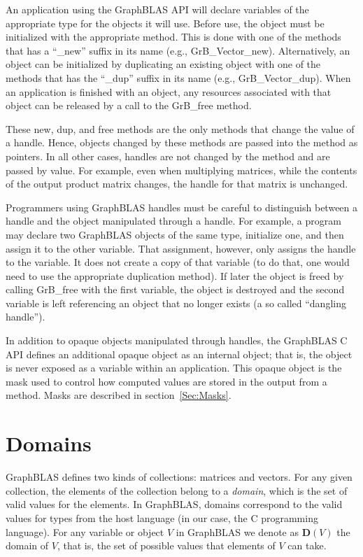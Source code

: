 An application using the GraphBLAS API will declare variables of the appropriate
type for the objects it will use.  Before use, the object must be initialized with 
the appropriate method.  This is done with one of the methods that has a ``{\sf \_new}'' suffix in its 
name (e.g., {\sf GrB\_Vector\_new}).  Alternatively, an object can be initialized by duplicating
an existing object with one of the methods that has the ``{\sf \_dup}'' suffix in its 
name  (e.g., {\sf GrB\_Vector\_dup}).   When an application is finished with 
an object, any resources associated with that object can be released by a
call to the {\sf GrB\_free} method.    

These {\sf new}, {\sf dup}, and {\sf free} methods are the only methods that 
change the value of a handle.  Hence, objects changed by these methods are passed
into the method as pointers.  In all other cases, handles are not changed by the 
method and are passed by value.  For example, even when multiplying matrices, 
while the contents of the output product matrix changes, the handle for that matrix is unchanged. 

Programmers using GraphBLAS handles must be careful to distinguish between a handle and the 
object manipulated through a handle.  For example, a program may declare two 
GraphBLAS objects of the same type, initialize one, and then assign it to the other
variable.  That assignment, however, only assigns the handle to the variable.  It does not 
create a copy of that variable (to do that, one would need to use the appropriate duplication method).
If later the object is freed by calling {\sf GrB\_free} with the first variable, the object
is destroyed and the second variable is left referencing an object that no longer 
exists (a so called ``dangling handle'').

In addition to opaque objects manipulated through handles, the GraphBLAS C API defines
an additional opaque object as an internal object; that is, the object is never exposed as
a variable within an application.  This opaque object is the mask used to
control how computed values are stored in the output from a method.  Masks 
are described in section~\ref{Sec:Masks}.

\section{Domains}

GraphBLAS defines two kinds of collections: matrices and vectors.
For any given collection, the elements of the collection belong to
a \emph{domain}, which is the set of valid values for the elements.
In GraphBLAS, domains correspond to the valid values for types from the
host language (in our case, the C programming language).  For any variable
or object $V$ in GraphBLAS we denote as $\mathbf{D}(V)$ the domain of $V$,
that is, the set of possible values that elements of $V$ can take.

